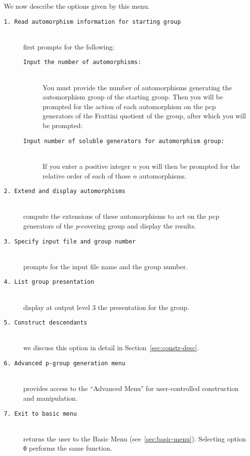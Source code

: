 \documentclass[12pt]{article}
\begin{document}
We now describe the options given by this menu.

\begin{description}
\item[\texttt{1.\ Read automorphism information for starting group}]\ \\
 first prompts for the following:
 \begin{description}
 \item[\texttt{Input the number of automorphisms:}]\ \\
  You must provide the number of automorphisms generating the automorphism
  group of the starting group. Then you will be prompted for the action
  of each automorphism on the pcp generators of the Frattini quotient of the
  group, after which you will be prompted:
 \item[\texttt{Input number of soluble generators for automorphism group:}]\ \\
  If you enter a positive integer $n$ you will then be prompted for the
  relative order of each of those $n$ automorphisms.
 \end{description}

\item[\texttt{2.\ Extend and display automorphisms}]\ \\
 compute the extensions of these automorphisms to act on the pcp generators
 of the {\it p}-covering group and display the results. 

\item[\texttt{3.\ Specify input file and group number}]\ \\
 prompts for the input file name and the group number.

\item[\texttt{4.\ List group presentation}]\ \\
 display at output level 3 the presentation for the group.

\item[\texttt{5.\ Construct descendants}]\ \\
 we discuss this option in detail in Section~\ref{sec:constr-desc}.

\item[\texttt{6.\ Advanced p-group generation menu}]\ \\
 provides access to the ``Advanced Menu" 
 for user-controlled construction and manipulation.

\item[\texttt{7.\ Exit to basic menu}]\ \\
 returns the user to the Basic Menu (see~\ref{sec:basic-menu}).
 Selecting option \texttt{0} performs the same function.
 
\end{description}
\end{document}
